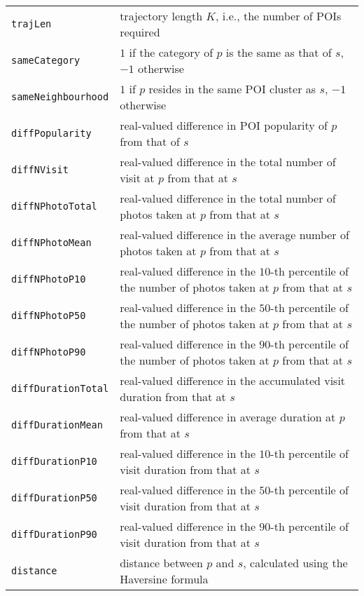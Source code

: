 \begin{table*}[ht]
\begin{tabular}{l|l}
\texttt{trajLen}           & trajectory length $K$, i.e., the number of POIs required \\
\texttt{sameCategory}      & $1$ if the category of $p$ is the same as that of $s$, $-1$ otherwise \\
\texttt{sameNeighbourhood} & $1$ if $p$ resides in the same POI cluster as $s$, $-1$ otherwise \\
\texttt{diffPopularity}    & real-valued difference in POI popularity of $p$ from that of $s$ \\
\texttt{diffNVisit}        & real-valued difference in the total number of visit at $p$ from that at $s$ \\
\texttt{diffNPhotoTotal}   & real-valued difference in the total number of photos taken at $p$ from that at $s$ \\
\texttt{diffNPhotoMean}    & real-valued difference in the average number of photos taken at $p$ from that at $s$ \\ 
\texttt{diffNPhotoP10}     & real-valued difference in the $10$-th percentile of the number of photos taken at $p$ from that at $s$ \\
\texttt{diffNPhotoP50}     & real-valued difference in the $50$-th percentile of the number of photos taken at $p$ from that at $s$ \\
\texttt{diffNPhotoP90}     & real-valued difference in the $90$-th percentile of the number of photos taken at $p$ from that at $s$ \\
\texttt{diffDurationTotal} & real-valued difference in the accumulated visit duration from that at $s$ \\
\texttt{diffDurationMean}  & real-valued difference in average duration at $p$ from that at $s$ \\
\texttt{diffDurationP10}   & real-valued difference in the $10$-th percentile of visit duration from that at $s$ \\
\texttt{diffDurationP50}   & real-valued difference in the $50$-th percentile of visit duration from that at $s$ \\
\texttt{diffDurationP90}   & real-valued difference in the $90$-th percentile of visit duration from that at $s$ \\
\texttt{distance}          & distance between $p$ and $s$, calculated using the Haversine formula \\
\hline
\end{tabular}
\end{table*}




